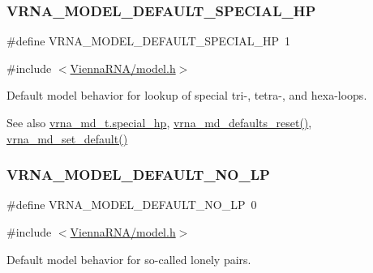 \subsubsection{\texorpdfstring{V\+R\+N\+A\+\_\+\+M\+O\+D\+E\+L\+\_\+\+D\+E\+F\+A\+U\+L\+T\+\_\+\+S\+P\+E\+C\+I\+A\+L\+\_\+\+HP}{VRNA\_MODEL\_DEFAULT\_SPECIAL\_HP}}
{\footnotesize\ttfamily \#define V\+R\+N\+A\+\_\+\+M\+O\+D\+E\+L\+\_\+\+D\+E\+F\+A\+U\+L\+T\+\_\+\+S\+P\+E\+C\+I\+A\+L\+\_\+\+HP~1}



{\ttfamily \#include $<$\hyperlink{model_8h}{Vienna\+R\+N\+A/model.\+h}$>$}



Default model behavior for lookup of special tri-\/, tetra-\/, and hexa-\/loops. 

\begin{DoxySeeAlso}{See also}
\hyperlink{group__model__details_add64a96d23e77ef1d0ddf8dfc5228143}{vrna\+\_\+md\+\_\+t.\+special\+\_\+hp}, \hyperlink{group__model__details_ga70834424cf804d149937de89f80ceb45}{vrna\+\_\+md\+\_\+defaults\+\_\+reset()}, \hyperlink{group__model__details_ga8ac6ff84936282436f822644bf841f66}{vrna\+\_\+md\+\_\+set\+\_\+default()} 
\end{DoxySeeAlso}
\mbox{\label{group__model__details_gab72462726dd60ed0d43339bbf7ee08ad}} 
\subsubsection{\texorpdfstring{V\+R\+N\+A\+\_\+\+M\+O\+D\+E\+L\+\_\+\+D\+E\+F\+A\+U\+L\+T\+\_\+\+N\+O\+\_\+\+LP}{VRNA\_MODEL\_DEFAULT\_NO\_LP}}
{\footnotesize\ttfamily \#define V\+R\+N\+A\+\_\+\+M\+O\+D\+E\+L\+\_\+\+D\+E\+F\+A\+U\+L\+T\+\_\+\+N\+O\+\_\+\+LP~0}



{\ttfamily \#include $<$\hyperlink{model_8h}{Vienna\+R\+N\+A/model.\+h}$>$}



Default model behavior for so-\/called \textquotesingle{}lonely pairs\textquotesingle{}. 

